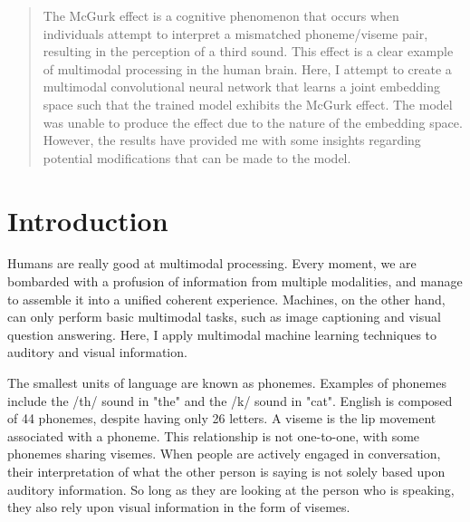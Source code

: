 \documentclass[conference]{IEEEtran}
\begin{document}
\begin{abstract}
The McGurk effect is a cognitive phenomenon that occurs when individuals attempt to interpret a mismatched phoneme/viseme pair, resulting in the perception of a third sound. This effect is a clear example of multimodal processing in the human brain. Here, I attempt to create a multimodal convolutional neural network that learns a joint embedding space such that the trained model exhibits the McGurk effect. The model was unable to produce the effect due to the nature of the embedding space. However, the results have provided me with some insights regarding potential modifications that can be made to the model.
\end{abstract}





%
\IEEEpeerreviewmaketitle



\section{Introduction}
Humans are really good at multimodal processing. Every moment, we are bombarded with a profusion of information from multiple modalities, and manage to assemble it into a unified coherent experience. Machines, on the other hand, can only perform basic multimodal tasks, such as image captioning and visual question answering. Here, I apply multimodal machine learning techniques to auditory and visual information.

The smallest units of language are known as phonemes. Examples of phonemes include the /th/ sound in "the" and the /k/ sound in "cat". English is composed of 44 phonemes, despite having only 26 letters. A viseme is the lip movement associated with a phoneme. This relationship is not one-to-one, with some phonemes sharing visemes. When people are actively engaged in conversation, their interpretation of what the other person is saying is not solely based upon auditory information. So long as they are looking at the person who is speaking, they also rely upon visual information in the form of visemes.
\end{document}
